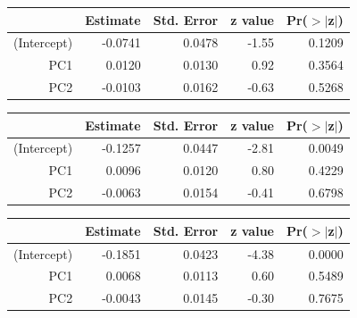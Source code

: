 \documentclass[a4paper,12pt]{Latex/Classes/PhDthesisPSnPDF}
\begin{document}
\newpage

\begin{center}
\begin{table}[ht]
\centering
\begin{tabular}{rrrrr}
  \hline
 & Estimate & Std. Error & z value & Pr($>$$|$z$|$) \\ 
  \hline
(Intercept) & -0.0741 & 0.0478 & -1.55 & 0.1209 \\ 
  PC1 & 0.0120 & 0.0130 & 0.92 & 0.3564 \\ 
  PC2 & -0.0103 & 0.0162 & -0.63 & 0.5268 \\ 
   \hline
\end{tabular}
\end{table}\end{center}

\begin{center}
\begin{table}[ht]
\centering
\begin{tabular}{rrrrr}
  \hline
 & Estimate & Std. Error & z value & Pr($>$$|$z$|$) \\ 
  \hline
(Intercept) & -0.1257 & 0.0447 & -2.81 & 0.0049 \\ 
  PC1 & 0.0096 & 0.0120 & 0.80 & 0.4229 \\ 
  PC2 & -0.0063 & 0.0154 & -0.41 & 0.6798 \\ 
   \hline
\end{tabular}
\end{table}\end{center}
\begin{center}
\begin{table}[ht]
\centering
\begin{tabular}{rrrrr}
  \hline
 & Estimate & Std. Error & z value & Pr($>$$|$z$|$) \\ 
  \hline
(Intercept) & -0.1851 & 0.0423 & -4.38 & 0.0000 \\ 
  PC1 & 0.0068 & 0.0113 & 0.60 & 0.5489 \\ 
  PC2 & -0.0043 & 0.0145 & -0.30 & 0.7675 \\ 
   \hline
\end{tabular}
\end{table}\end{center}
\end{document}
